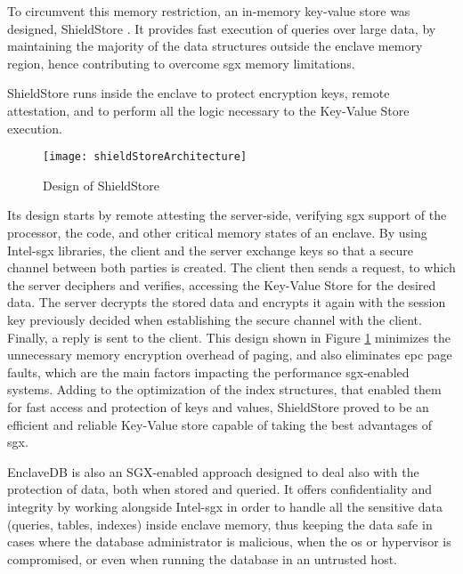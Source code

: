 To circumvent this memory restriction, an in-memory key-value store was designed, ShieldStore \cite{shieldStorePaper}. It provides fast execution of queries over large data, by maintaining the majority of the data structures outside the enclave memory region, hence contributing to overcome \gls{sgx} memory limitations.

ShieldStore runs inside the enclave to protect encryption keys, remote attestation, and to perform all the logic necessary to the Key-Value Store execution.
\begin{figure}[htbp]
	\centering
	{\texttt{[image: shieldStoreArchitecture]}}
	\caption{Design of ShieldStore}
	\label{fig:shieldStoreArchitecture}
\end{figure}

Its design starts by remote attesting the server-side, verifying \gls{sgx} support of the processor, the code, and other critical memory states of an enclave. By using Intel-\gls{sgx} libraries, the client and the server exchange keys so that a secure channel between both parties is created. The client then sends a request, to which the server deciphers and verifies, accessing the Key-Value Store for the desired data. The server decrypts the stored data and encrypts it again with the session key previously decided when establishing the secure channel with the client. Finally, a reply is sent to the client.    
This design shown in Figure \ref{fig:shieldStoreArchitecture} minimizes the unnecessary memory encryption overhead of paging, and also eliminates \gls{epc} page faults, which are the main factors impacting the performance \gls{sgx}-enabled systems. Adding to the optimization of the index structures, that enabled them for fast access and protection of keys and values, ShieldStore proved to be an efficient and reliable Key-Value store capable of taking the best advantages of \gls{sgx}.\newline


EnclaveDB \cite{enclavedbPaper} is also an SGX-enabled approach designed to deal also with the protection of data, both when stored and queried. It offers confidentiality and integrity by working alongside Intel-\gls{sgx} in order to handle all the sensitive data (queries, tables, indexes) inside enclave memory, thus keeping the data safe in cases  where the database administrator is malicious, when the \gls{os} or hypervisor is compromised, or even when running the database in an untrusted host.

